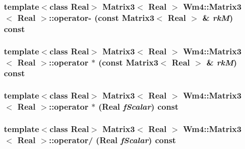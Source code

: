 \subsubsection{\setlength{\rightskip}{0pt plus 5cm}template$<$class Real$>$ {\bf Matrix3}$<$ Real $>$ {\bf Wm4::Matrix3}$<$ Real $>$::operator- (const {\bf Matrix3}$<$ Real $>$ \& {\em rk\-M}) const\hspace{0.3cm}{\tt  [inline]}}\label{classWm4_1_1Matrix3_756adec41f7a4f4b3cbef672b29ded08}


\subsubsection{\setlength{\rightskip}{0pt plus 5cm}template$<$class Real$>$ {\bf Matrix3}$<$ Real $>$ {\bf Wm4::Matrix3}$<$ Real $>$::operator $\ast$ (const {\bf Matrix3}$<$ Real $>$ \& {\em rk\-M}) const\hspace{0.3cm}{\tt  [inline]}}\label{classWm4_1_1Matrix3_f148a98abee064e95617b4478353d6a0}


\subsubsection{\setlength{\rightskip}{0pt plus 5cm}template$<$class Real$>$ {\bf Matrix3}$<$ Real $>$ {\bf Wm4::Matrix3}$<$ Real $>$::operator $\ast$ (Real {\em f\-Scalar}) const\hspace{0.3cm}{\tt  [inline]}}\label{classWm4_1_1Matrix3_ac900823579d732391f65493b85a74df}


\subsubsection{\setlength{\rightskip}{0pt plus 5cm}template$<$class Real$>$ {\bf Matrix3}$<$ Real $>$ {\bf Wm4::Matrix3}$<$ Real $>$::operator/ (Real {\em f\-Scalar}) const\hspace{0.3cm}{\tt  [inline]}}\label{classWm4_1_1Matrix3_1bbae58803bf031b72af473d68249bd2}



